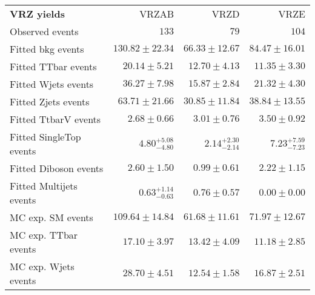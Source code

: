 

\begin{table}
\begin{center}
\setlength{\tabcolsep}{0.0pc}
{\small
\begin{tabular*}{\textwidth}{@{\extracolsep{\fill}}lrrr}
\noalign{\smallskip}\hline\noalign{\smallskip}
{\bf VRZ yields}           & VRZAB            & VRZD            & VRZE              \\[-0.05cm]
\noalign{\smallskip}\hline\noalign{\smallskip}
Observed events          & $133$              & $79$              & $104$                    \\
\noalign{\smallskip}\hline\noalign{\smallskip}
Fitted bkg events         & $130.82 \pm 22.34$          & $66.33 \pm 12.67$          & $84.47 \pm 16.01$              \\
\noalign{\smallskip}\hline\noalign{\smallskip}
        Fitted TTbar events         & $20.14 \pm 5.21$          & $12.70 \pm 4.13$          & $11.35 \pm 3.30$              \\
        Fitted Wjets events         & $36.27 \pm 7.98$          & $15.87 \pm 2.84$          & $21.32 \pm 4.30$              \\
        Fitted Zjets events         & $63.71 \pm 21.66$          & $30.85 \pm 11.84$          & $38.84 \pm 13.55$              \\
        Fitted TtbarV events         & $2.68 \pm 0.66$          & $3.01 \pm 0.76$          & $3.50 \pm 0.92$              \\
        Fitted SingleTop events         & $4.80_{-4.80}^{+5.08}$          & $2.14_{-2.14}^{+2.30}$          & $7.23_{-7.23}^{+7.59}$              \\
        Fitted Diboson events         & $2.60 \pm 1.50$          & $0.99 \pm 0.61$          & $2.22 \pm 1.15$              \\
        Fitted Multijets events         & $0.63_{-0.63}^{+1.14}$          & $0.76 \pm 0.57$          & $0.00 \pm 0.00$              \\
 \noalign{\smallskip}\hline\noalign{\smallskip}
MC exp. SM events              & $109.64 \pm 14.84$          & $61.68 \pm 11.61$          & $71.97 \pm 12.67$              \\
\noalign{\smallskip}\hline\noalign{\smallskip}
        MC exp. TTbar events         & $17.10 \pm 3.97$          & $13.42 \pm 4.09$          & $11.18 \pm 2.85$              \\
        MC exp. Wjets events         & $28.70 \pm 4.51$          & $12.54 \pm 1.58$          & $16.87 \pm 2.51$              \\

\end{tabular*}}
\end{center}
\end{table}
